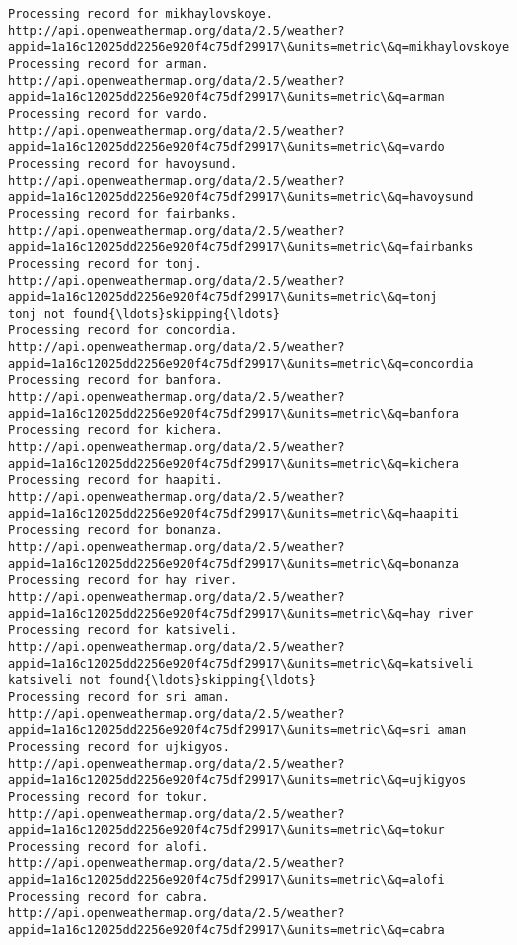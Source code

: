 \documentclass[11pt]{article}
\begin{document}
\begin{Verbatim}[commandchars=\\\{\}]
Processing record for mikhaylovskoye.
http://api.openweathermap.org/data/2.5/weather?appid=1a16c12025dd2256e920f4c75df29917\&units=metric\&q=mikhaylovskoye
Processing record for arman.
http://api.openweathermap.org/data/2.5/weather?appid=1a16c12025dd2256e920f4c75df29917\&units=metric\&q=arman
Processing record for vardo.
http://api.openweathermap.org/data/2.5/weather?appid=1a16c12025dd2256e920f4c75df29917\&units=metric\&q=vardo
Processing record for havoysund.
http://api.openweathermap.org/data/2.5/weather?appid=1a16c12025dd2256e920f4c75df29917\&units=metric\&q=havoysund
Processing record for fairbanks.
http://api.openweathermap.org/data/2.5/weather?appid=1a16c12025dd2256e920f4c75df29917\&units=metric\&q=fairbanks
Processing record for tonj.
http://api.openweathermap.org/data/2.5/weather?appid=1a16c12025dd2256e920f4c75df29917\&units=metric\&q=tonj
tonj not found{\ldots}skipping{\ldots}
Processing record for concordia.
http://api.openweathermap.org/data/2.5/weather?appid=1a16c12025dd2256e920f4c75df29917\&units=metric\&q=concordia
Processing record for banfora.
http://api.openweathermap.org/data/2.5/weather?appid=1a16c12025dd2256e920f4c75df29917\&units=metric\&q=banfora
Processing record for kichera.
http://api.openweathermap.org/data/2.5/weather?appid=1a16c12025dd2256e920f4c75df29917\&units=metric\&q=kichera
Processing record for haapiti.
http://api.openweathermap.org/data/2.5/weather?appid=1a16c12025dd2256e920f4c75df29917\&units=metric\&q=haapiti
Processing record for bonanza.
http://api.openweathermap.org/data/2.5/weather?appid=1a16c12025dd2256e920f4c75df29917\&units=metric\&q=bonanza
Processing record for hay river.
http://api.openweathermap.org/data/2.5/weather?appid=1a16c12025dd2256e920f4c75df29917\&units=metric\&q=hay river
Processing record for katsiveli.
http://api.openweathermap.org/data/2.5/weather?appid=1a16c12025dd2256e920f4c75df29917\&units=metric\&q=katsiveli
katsiveli not found{\ldots}skipping{\ldots}
Processing record for sri aman.
http://api.openweathermap.org/data/2.5/weather?appid=1a16c12025dd2256e920f4c75df29917\&units=metric\&q=sri aman
Processing record for ujkigyos.
http://api.openweathermap.org/data/2.5/weather?appid=1a16c12025dd2256e920f4c75df29917\&units=metric\&q=ujkigyos
Processing record for tokur.
http://api.openweathermap.org/data/2.5/weather?appid=1a16c12025dd2256e920f4c75df29917\&units=metric\&q=tokur
Processing record for alofi.
http://api.openweathermap.org/data/2.5/weather?appid=1a16c12025dd2256e920f4c75df29917\&units=metric\&q=alofi
Processing record for cabra.
http://api.openweathermap.org/data/2.5/weather?appid=1a16c12025dd2256e920f4c75df29917\&units=metric\&q=cabra

\end{Verbatim}
\end{document}
